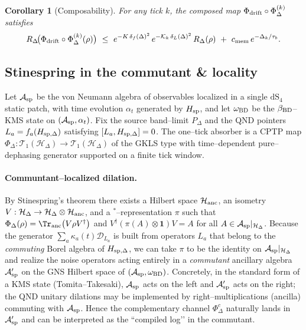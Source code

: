 \documentclass[10pt]{article}
\theoremstyle{definition}
\theoremstyle{plain}
\newtheorem{corollary}{Corollary}[section]
\begin{document}
\begin{corollary}[Composability]
\label{cor:uom-main-001}
For any tick \(k\), the composed map \(\Phi_{\rm drift}\circ \Phi_\Delta^{(k)}\) satisfies
\[
R_\Delta\!\big(\Phi_{\rm drift}\circ \Phi_\Delta^{(k)}(\rho)\big)
\ \le\ e^{-K\,\delta_f(\Delta)^2}\,e^{-\mathcal K_k\,\delta_L(\Delta)^2}\,R_\Delta(\rho)\ +\ c_{\rm mem}\,e^{-\Delta_k/\tau_b}.
\]
\end{corollary}

\medskip

\subsection{Stinespring in the commutant \& locality}\label{subsec:commutant-stinespring}
Let \(\mathcal A_{\rm sp}\) be the von Neumann algebra of observables localized in a single \(\mathrm{dS}_4\) static patch, with time evolution \(\alpha_t\) generated by \(H_{\rm sp}\), and let \(\omega_{\rm BD}\) be the \(\beta_{\rm BD}\)–KMS state on \((\mathcal A_{\rm sp},\alpha_t)\).
Fix the source band–limit \(P_\Delta\) and the QND pointers \(L_a=f_a(H_{{\rm sp},\Delta})\) satisfying \([L_a,H_{{\rm sp},\Delta}]=0\).
The one–tick absorber is a CPTP map \(\Phi_\Delta:\mathcal T_1(\mathcal H_\Delta)\to \mathcal T_1(\mathcal H_\Delta)\) of the GKLS type with time–dependent pure–dephasing generator supported on a finite tick window.

\paragraph{Communtant–localized dilation.}\label{par:uom-main-218}
By Stinespring’s theorem there exists a Hilbert space \(\mathcal H_{\rm anc}\), an isometry \(V:\mathcal H_\Delta\to \mathcal H_\Delta\otimes \mathcal H_{\rm anc}\), and a \(^*\)–representation \(\pi\) such that
\(
\Phi_\Delta(\rho)=\Tr_{\rm anc}\big(V\rho V^\dagger\big)
\)
and \(V^\dagger(\pi(A)\otimes \mathbf 1)V=A\) for all \(A\in\mathcal A_{\rm sp}|_{\mathcal H_\Delta}\).
Because the generator \(\sum_a \kappa_a(t)\mathcal D_{L_a}\) is built from operators \(L_a\) that belong to the \emph{commuting} Borel algebra of \(H_{{\rm sp},\Delta}\), we can take \(\pi\) to be the identity on \(\mathcal A_{\rm sp}|_{\mathcal H_\Delta}\) and realize the noise operators acting entirely in a \emph{commutant} ancillary algebra \(\mathcal A'_{\rm sp}\) on the GNS Hilbert space of \((\mathcal A_{\rm sp},\omega_{\rm BD})\).
Concretely, in the standard form of a KMS state (Tomita–Takesaki), \(\mathcal A_{\rm sp}\) acts on the left and \(\mathcal A'_{\rm sp}\) acts on the right; the QND unitary dilations may be implemented by right–multiplications (ancilla) commuting with \(\mathcal A_{\rm sp}\).
Hence the complementary channel \(\Phi_\Delta^c\) naturally lands in \(\mathcal A'_{\rm sp}\) and can be interpreted as the ``compiled log’’ in the commutant.
\end{document}
